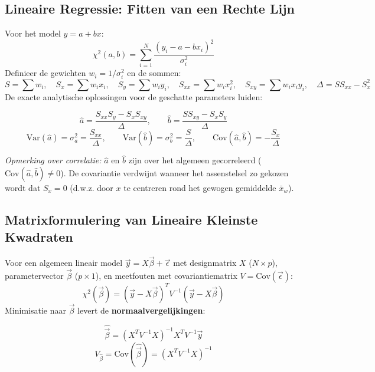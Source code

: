 \documentclass[11pt,a4paper]{article}
\newcommand{\Var}{\text{Var}}
\newcommand{\Cov}{\text{Cov}}
\begin{document}
\subsection{Lineaire Regressie: Fitten van een Rechte Lijn}
Voor het model $y = a + bx$:
\begin{equation}
    \chi^2(a, b) = \sum_{i=1}^N \frac{(y_i - a - bx_i)^2}{\sigma_i^2}
\end{equation}
Definieer de gewichten $w_i = 1/\sigma_i^2$ en de sommen:
\begin{equation}
    S = \sum w_i, \quad S_x = \sum w_i x_i, \quad S_y = \sum w_i y_i, \quad S_{xx} = \sum w_i x_i^2, \quad S_{xy} = \sum w_i x_i y_i, \quad \Delta = S S_{xx} - S_x^2
\end{equation}
De exacte analytische oplossingen voor de geschatte parameters luiden:
\begin{formulabox}
\begin{equation}
    \hat{a} = \frac{S_{xx} S_y - S_x S_{xy}}{\Delta}, \qquad \hat{b} = \frac{S S_{xy} - S_x S_y}{\Delta}
\end{equation}
\begin{equation}
    \Var(\hat{a}) = \sigma_a^2 = \frac{S_{xx}}{\Delta}, \qquad \Var(\hat{b}) = \sigma_b^2 = \frac{S}{\Delta}, \qquad \Cov(\hat{a}, \hat{b}) = -\frac{S_x}{\Delta}
\end{equation}
\end{formulabox}
\emph{Opmerking over correlatie:} $\hat{a}$ en $\hat{b}$ zijn over het algemeen gecorreleerd ($\Cov(\hat{a}, \hat{b}) \neq 0$). De covariantie verdwijnt wanneer het assenstelsel zo gekozen wordt dat $S_x = 0$ (d.w.z. door $x$ te centreren rond het gewogen gemiddelde $\bar{x}_w$).

\subsection{Matrixformulering van Lineaire Kleinste Kwadraten}
Voor een algemeen lineair model $\vec{y} = X \vec{\beta} + \vec{\epsilon}$ met designmatrix $X$ ($N \times p$), parametervector $\vec{\beta}$ ($p \times 1$), en meetfouten met covariantiematrix $V = \Cov(\vec{\epsilon})$:
\begin{equation}
    \chi^2(\vec{\beta}) = (\vec{y} - X\vec{\beta})^T V^{-1} (\vec{y} - X\vec{\beta})
\end{equation}
Minimisatie naar $\vec{\beta}$ levert de \textbf{normaalvergelijkingen}:
\begin{formulabox}
\begin{equation}
    \hat{\vec{\beta}} = (X^T V^{-1} X)^{-1} X^T V^{-1} \vec{y}
\end{equation}
\begin{equation}
    V_{\hat{\beta}} = \Cov(\hat{\vec{\beta}}) = (X^T V^{-1} X)^{-1}
\end{equation}
\end{formulabox}
\end{document}
